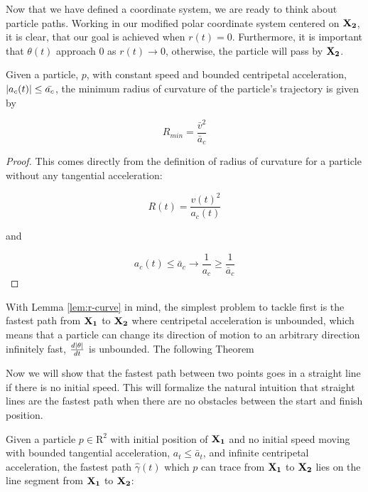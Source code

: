 Now that we have defined a coordinate system, we are ready to think about particle paths. Working in our modified polar coordinate system centered on $\mathbf{X_2}$, it is clear, that our goal is achieved when $r(t) = 0$. Furthermore, it is important that $\theta(t)$ approach $0$ as $r(t) \to 0$, otherwise, the particle will pass by $\mathbf{X_2}$.

\begin{lemma} \label{lem:r-curve}
  Given a particle, $p$, with constant speed and bounded centripetal acceleration, $\abs{a_c(t)} \le \bar{a_c}$, the minimum radius of curvature of the particle's trajectory is given by

  \begin{equation}
    R_{min} = \frac{\bar{v}^2}{\bar{a}_c}
  \end{equation}
  \end{lemma}

\begin{proof}

This comes directly from the definition of radius of curvature for a particle without any tangential acceleration:

\[
  R(t) = \frac{v(t)^2}{a_c(t)}
\]

and 

\[
  a_c(t) \le \bar{a}_c \to \frac{1}{a_c} \ge \frac{1}{\bar{a}_c}
\]
\end{proof}

With Lemma \ref{lem:r-curve} in mind, the simplest problem to tackle first is the fastest path from $\mathbf{X_1}$ to $\mathbf{X_2}$ where centripetal acceleration is unbounded, which means that a particle can change its direction of motion to an arbitrary direction infinitely fast, $\frac{d\abs{\theta}}{dt}$ is unbounded. The following Theorem 

Now we will show that the fastest path between two points goes in a straight line if there is no initial speed. This will formalize the natural intuition that straight lines are the fastest path when there are no obstacles between the start and finish position.

\begin{theorem}
  \label{thm:line-proof}
  Given a particle $p \in \mathrm{R}^2$ with initial position of $\mathbf{X_1}$ and no initial speed moving with bounded tangential acceleration, $a_t \le \bar{a}_{t}$, and infinite centripetal acceleration, the fastest path $\hat{\gamma}(t)$ which $p$ can trace from $\mathbf{X_1}$ to $\mathbf{X_2}$ lies on the line segment from $\mathbf{X_1}$ to $\mathbf{X_2}$:
\end{theorem}

